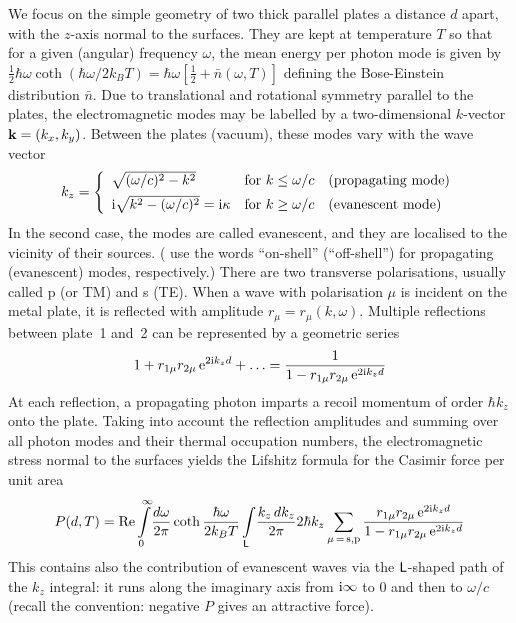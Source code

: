 \documentclass[11pt, oneside]{article}   	%
\def\pol{\mu}
\begin{document}
We focus on the simple geometry of two thick parallel plates a distance $d$ apart, 
with the $z$-axis normal to the surfaces. 
They are kept at temperature $T$ so that 
for a given (angular) frequency $\omega$, the mean energy per photon mode is
given by $\frac12 \hbar \omega \coth( \hbar \omega / 2 k_B T) = 
\hbar \omega [ \frac12 + \bar n( \omega, T ) ]$ defining the Bose-Einstein distribution
$\bar n$. Due to translational and rotational symmetry parallel 
to the plates, the
electromagnetic modes may be labelled by a two-dimensional $k$-vector 
${\bf k} = (k_x, k_y)$. Between the plates (vacuum), these modes vary with the wave vector
\begin{equation}
k_z = \left\{
\begin{array}{ll}
\sqrt{ (\omega/c)^2 - k^2 } & \mbox{for } k \le \omega/c \quad \mbox{(propagating mode)}
\\[1ex]
{\rm i} \sqrt{ k^2 - (\omega/c)^2 } = {\rm i} \kappa & \mbox{for } k \ge \omega/c
\quad \mbox{(evanescent mode)}
\end{array}
\right.
\label{eq:normal_wavevector}
\end{equation}
In the second case, the modes are called evanescent, and they 
are localised to the vicinity of their sources. 
(\citet{Klimchitskaya_2020b} use the words ``on-shell'' (``off-shell'') for 
propagating (evanescent) modes, respectively.)
There are two
transverse polarisations, usually called p (or TM) and s (TE). When a wave with
polarisation $\pol$ is incident on the metal plate, it is reflected with amplitude
$r_\pol = r_\pol(k, \omega)$. Multiple reflections between plate~1 and~2 can be represented 
by a geometric series
\begin{equation}
1 + r_{1\pol} r_{2\pol} \,{\rm e}^{ 2 {\rm i} k_z d } + \ldots =
\frac{ 1 }{ 
1 - r_{1\pol} r_{2\pol} \,{\rm e}^{ 2 {\rm i} k_z d } 
}
\label{eq:cavity-loop-factor}
\end{equation}
At each reflection, a propagating photon imparts a recoil momentum of order $\hbar k_z$ 
onto the plate. Taking into account the reflection amplitudes and summing over all photon modes 
and their thermal occupation numbers, the electromagnetic stress normal to the surfaces
yields the Lifshitz formula for the Casimir force per unit area \citep{Lifshitz_1956}
\begin{equation}
P(d,T) = 
\mathop{\rm Re} 
\int\limits_0^\infty\!\frac{d\omega}{2\pi} \coth\frac{\hbar\omega}{2k_BT}
\int\limits_{\sf L}\!\frac{k_z \, dk_z }{2\pi} 
2 \hbar k_z \sum_{\pol \,=\, {\rm s,p}} 
\frac{ r_{1\pol}r_{2\pol} \,{\rm e}^{2{\rm i} k_z d} 
    }{ 
       1- r_{1\pol}r_{2\pol} \,{\rm e}^{2{\rm i} k_z d} 
     }
\label{eq:Lifshitz56}
\end{equation}
This contains also the contribution of evanescent waves via the ${\sf L}$-shaped
path of the $k_z$ integral: it runs along the imaginary axis from ${\rm i}\infty$ to 
$0$ and then to $\omega/c$ (recall the convention: negative $P$ gives an
attractive force).
\end{document}
